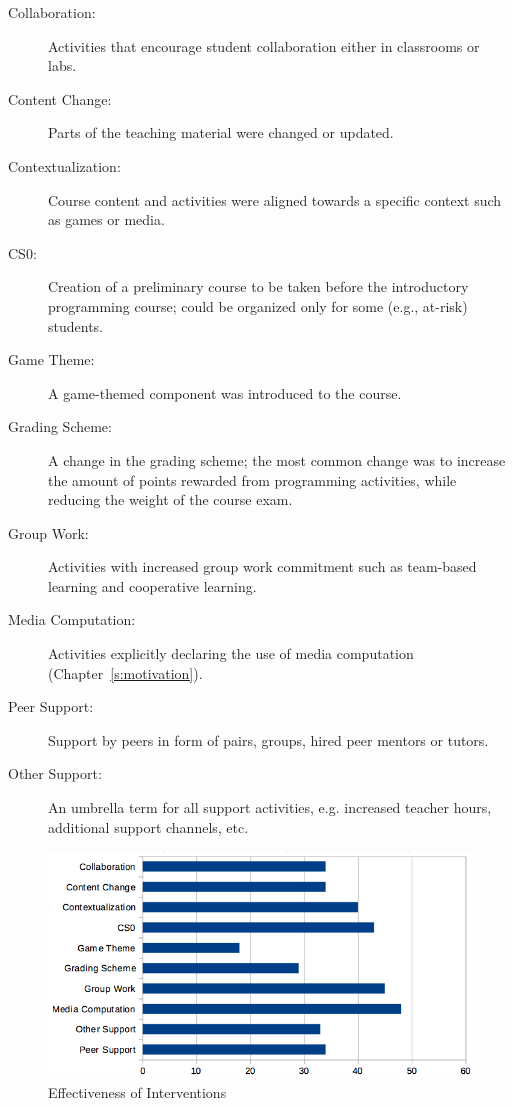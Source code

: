 \begin{description}
\item[Collaboration:]
Activities that encourage student collaboration either in classrooms
or labs.
\item[Content Change:]
Parts of the teaching material were changed or updated.
\item[Contextualization:]
Course content and activities were aligned towards a specific
context such as games or media.
\item[CS0:]
Creation of a preliminary course to be taken before the introductory
programming course; could be organized only for some (e.g., at-risk)
students.
\item[Game Theme:]
A game-themed component was introduced to the course.
\item[Grading Scheme:]
A change in the grading scheme; the most common change was to
increase the amount of points rewarded from programming activities,
while reducing the weight of the course exam.
\item[Group Work:]
Activities with increased group work commitment such as team-based
learning and cooperative learning.
\item[Media Computation:]
Activities explicitly declaring the use of media computation
(Chapter~\ref{s:motivation}).
\item[Peer Support:]
Support by peers in form of pairs, groups, hired peer mentors or
tutors.
\item[Other Support:]
An umbrella term for all support activities, e.g. increased teacher
hours, additional support channels, etc.
\end{description}

\begin{figure}
\centering
\includegraphics{../../figures/interventions.png}
\caption{Effectiveness of Interventions}
\label{f:pck-interventions}
\end{figure}

